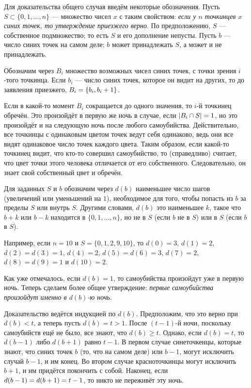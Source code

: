 Для доказательства общего случая введём некоторые обозначения.
Пусть $S\subset\{0,1,\dots,n\}$ --- множество чисел $x$ с таким свойством: \emph{если у $n$ точкинцев $x$ синих точек, то утверждение приезжего верно}.
По предположению, $S$ --- собственное подмножество; то есть $S$ и его дополнение непусты.
Пусть $b$ --- число синих точек на самом деле;
$b$ может принадлежать $S$, а может и не принадлежать.

Обозначим через $B_i$ множество возможных чисел синих точек, с точки зрения $i$-того точкинца.
Если $b_i$ --- число синих точек, которое он видит на других, то до заявления приезжего, $B_i=\{b_i,b_i\z+1\}$.

Если в какой-то момент $B_i$ сокращается до одного значения, то $i$-й точкинец обречён.
Это произойдёт в первую же ночь в случае, если  $|B_i\z\cap S|=1$, но это произойдёт и на следующую ночь после любого самоубийства.
Действительно, все точкинцы с одинаковым цветом точек ведут себя одинаково, ведь они все видят одинаковое число точек каждого цвета.
Таким образом, если какой-то точкинец видит, что кто-то совершил самоубийство, то (справедливо) считает, что цвет точки этого человека отличается от его собственного. 
Следовательно, он знает свой собственный цвет и обречён.

Для заданных $S$ и $b$ обозначим через $d(b)$ наименьшее число шагов (увеличений или уменьшений на $1$), необходимое для того, чтобы попасть из $b$ за пределы $S$ или внутрь $S$.
Другими словами, $d(b)$ это наименьшее $k$, такое что $b+k$ или $b-k$ находится в $\{0, 1, \dots, n\}$, но не в $S$ (если $b$ не в  $S$) или в $S$ (если $b$ в $S$).

Например, если $n=10$ и 
$S=\{0,1,2,9,10\}$, то 
$d(0)=3$, 
$d(1)=2$, 
$d(2)=d(3)=1$, 
$d(4)=2$, 
$d(5)=d(6)=3$, 
$d(7)=2$, 
$d(8)=d(9)=1$ и
$d(10)=2$.

Как уже отмечалось, если $d(b)=1$, то самоубийства произойдут уже в первую ночь.
Теперь сделаем более общее утверждение: \emph{первые самоубийства произойдут именно в $d(b)$-ю ночь}.

Доказательство ведётся индукцией по $d(b)$.
Предположим, что это верно при $d(b)<t$, а теперь пусть $d(b)=t>1$.
После $(t-1)$-й ночи, поскольку самоубийств ещё не было, все знают, что $d(b)\ge t$.
Однако, если $d(b)=t$, то $d(b-1)$ либо $d(b+1)$ равно $t-1$.
В первом случае синеточкенцы, которые знают, что синих точек $b$ (то, что на самом деле) или $b-1$, 
могут исключить случай $b-1$, и им конец.
Во втором случае красноточкинцы могут исключить $b+1$, и им придётся покончить с собой.
Наконец, если $d(b-1)\z=d(b+1)=t-1$, то никто не переживёт эту ночь.

